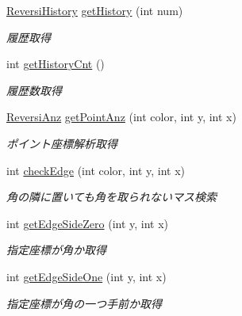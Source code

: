 \begin{DoxyCompactItemize}
\hyperlink{classjp_1_1gr_1_1java__conf_1_1yuta__yoshinaga_1_1reversi_1_1model_1_1_reversi_history}{Reversi\+History} \hyperlink{classjp_1_1gr_1_1java__conf_1_1yuta__yoshinaga_1_1reversi_1_1model_1_1_reversi_af781f5ebb4fb33b574ec58acfb45a796}{get\+History} (int num)
\begin{DoxyCompactList}\small\item\em 履歴取得 \end{DoxyCompactList}\item 
int \hyperlink{classjp_1_1gr_1_1java__conf_1_1yuta__yoshinaga_1_1reversi_1_1model_1_1_reversi_a286949e070d0cfc8a1d9562a298b7b98}{get\+History\+Cnt} ()
\begin{DoxyCompactList}\small\item\em 履歴数取得 \end{DoxyCompactList}\item 
\hyperlink{classjp_1_1gr_1_1java__conf_1_1yuta__yoshinaga_1_1reversi_1_1model_1_1_reversi_anz}{Reversi\+Anz} \hyperlink{classjp_1_1gr_1_1java__conf_1_1yuta__yoshinaga_1_1reversi_1_1model_1_1_reversi_a6da3f67c0468cf59ba6ceb796133c921}{get\+Point\+Anz} (int color, int y, int x)
\begin{DoxyCompactList}\small\item\em ポイント座標解析取得 \end{DoxyCompactList}\item 
int \hyperlink{classjp_1_1gr_1_1java__conf_1_1yuta__yoshinaga_1_1reversi_1_1model_1_1_reversi_a4874c6523adfdfd42dfbd625f5e3fe7a}{check\+Edge} (int color, int y, int x)
\begin{DoxyCompactList}\small\item\em 角の隣に置いても角を取られないマス検索 \end{DoxyCompactList}\item 
int \hyperlink{classjp_1_1gr_1_1java__conf_1_1yuta__yoshinaga_1_1reversi_1_1model_1_1_reversi_a3989b051544745724fc372d4a6b8a7f7}{get\+Edge\+Side\+Zero} (int y, int x)
\begin{DoxyCompactList}\small\item\em 指定座標が角か取得 \end{DoxyCompactList}\item 
int \hyperlink{classjp_1_1gr_1_1java__conf_1_1yuta__yoshinaga_1_1reversi_1_1model_1_1_reversi_aa3c701584a82e4656cb1c60123454953}{get\+Edge\+Side\+One} (int y, int x)
\begin{DoxyCompactList}\small\item\em 指定座標が角の一つ手前か取得 \end{DoxyCompactList}\item 

\end{DoxyCompactItemize}
